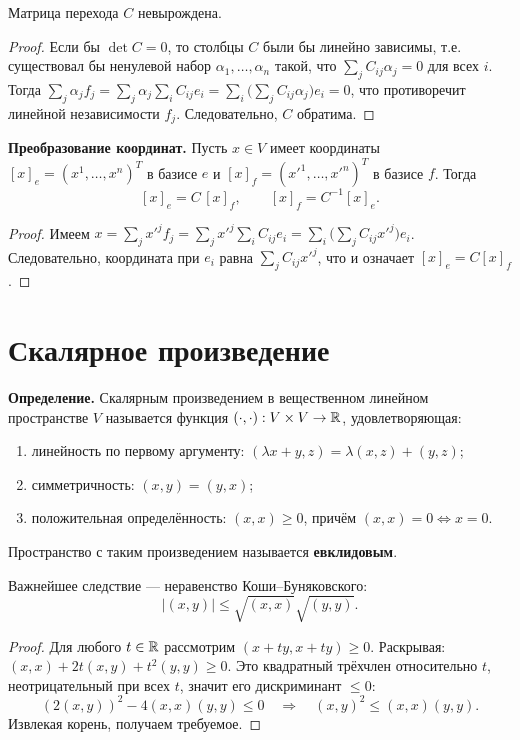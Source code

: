 \documentclass[10pt]{article}
\begin{document}
\begin{lemma}
Матрица перехода $C$ невырождена.
\end{lemma}
\begin{proof}
Если бы $\det C = 0$, то столбцы $C$ были бы линейно зависимы, т.е. существовал бы ненулевой набор $\alpha_1,\dots,\alpha_n$ такой, что $\sum_{j} C_{ij}\alpha_j = 0$ для всех $i$. Тогда $\sum_j \alpha_j f_j = \sum_j \alpha_j \sum_i C_{ij} e_i = \sum_i \bigl(\sum_j C_{ij}\alpha_j\bigr) e_i = 0$, что противоречит линейной независимости $f_j$. Следовательно, $C$ обратима.
\end{proof}

\textbf{Преобразование координат.} Пусть $x \in V$ имеет координаты $[x]_e = (x^1,\dots,x^n)^T$ в базисе $e$ и $[x]_f = (x'^1,\dots,x'^n)^T$ в базисе $f$. Тогда
\[
[x]_e = C\, [x]_f,\qquad [x]_f = C^{-1} [x]_e.
\]

\begin{proof}
Имеем $x = \sum_{j} x'^j f_j = \sum_{j} x'^j \sum_i C_{ij} e_i = \sum_i \bigl( \sum_j C_{ij} x'^j \bigr) e_i$. Следовательно, координата при $e_i$ равна $\sum_j C_{ij} x'^j$, что и означает $[x]_e = C [x]_f$.
\end{proof}

\section{Скалярное произведение}

\textbf{Определение.} Скалярным произведением в вещественном линейном пространстве $V$ называется функция $(\cdot,\cdot): V\times V \to \mathbb{R}$, удовлетворяющая:
\begin{enumerate}
  \item линейность по первому аргументу: $(\lambda x + y, z) = \lambda (x,z) + (y,z)$;
  \item симметричность: $(x,y) = (y,x)$;
  \item положительная определённость: $(x,x) \ge 0$, причём $(x,x)=0 \iff x=0$.
\end{enumerate}
Пространство с таким произведением называется \textbf{евклидовым}.

Важнейшее следствие — неравенство Коши--Буняковского:
\[
|(x,y)| \le \sqrt{(x,x)}\sqrt{(y,y)}.
\]

\begin{proof}
Для любого $t \in \mathbb{R}$ рассмотрим $(x+ty, x+ty) \ge 0$. Раскрывая: $(x,x) + 2t(x,y) + t^2(y,y) \ge 0$. Это квадратный трёхчлен относительно $t$, неотрицательный при всех $t$, значит его дискриминант $\le 0$:
\[
(2(x,y))^2 - 4(x,x)(y,y) \le 0 \quad\Rightarrow\quad (x,y)^2 \le (x,x)(y,y).
\]
Извлекая корень, получаем требуемое.
\end{proof}
\end{document}

